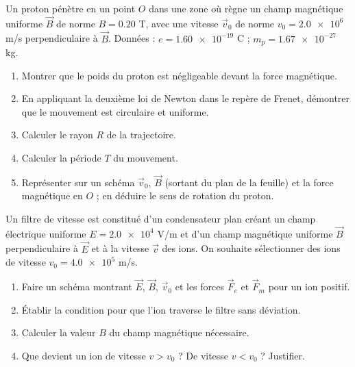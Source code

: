 \documentclass[11pt]{article}
\begin{document}
\begin{exercice}
Un proton pénètre en un point $O$ dans une zone où règne un champ magnétique uniforme $\vec{B}$ de norme $B = \num{0,20}$ T, avec une vitesse $\vec{v}_0$ de norme $v_0 = \num{2,0e6}$ m/s perpendiculaire à $\vec{B}$.
Données : $e = \num{1,60e-19}$ C ; $m_p = \num{1,67e-27}$ kg.
\begin{enumerate}
\item Montrer que le poids du proton est négligeable devant la force magnétique.
\item En appliquant la deuxième loi de Newton dans le repère de Frenet, démontrer que le mouvement est circulaire et uniforme.
\item Calculer le rayon $R$ de la trajectoire.
\item Calculer la période $T$ du mouvement.
\item Représenter sur un schéma $\vec{v}_0$, $\vec{B}$ (sortant du plan de la feuille) et la force magnétique en $O$ ; en déduire le sens de rotation du proton.
\end{enumerate}
\end{exercice}

\begin{exercice}
Un filtre de vitesse est constitué d'un condensateur plan créant un champ électrique uniforme $E = \num{2,0e4}$ V/m et d'un champ magnétique uniforme $\vec{B}$ perpendiculaire à $\vec{E}$ et à la vitesse $\vec{v}$ des ions. On souhaite sélectionner des ions de vitesse $v_0 = \num{4,0e5}$ m/s.
\begin{enumerate}
\item Faire un schéma montrant $\vec{E}$, $\vec{B}$, $\vec{v}_0$ et les forces $\vec{F}_e$ et $\vec{F}_m$ pour un ion positif.
\item Établir la condition pour que l'ion traverse le filtre sans déviation.
\item Calculer la valeur $B$ du champ magnétique nécessaire.
\item Que devient un ion de vitesse $v > v_0$ ? De vitesse $v < v_0$ ? Justifier.
\end{enumerate}
\end{exercice}
\end{document}
